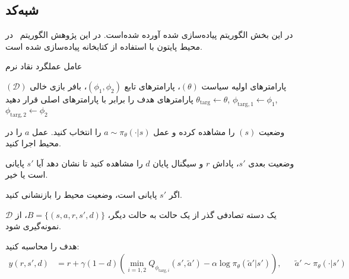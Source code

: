 \subsection{شبه‌کد
	}

در این بخش الگوریتم
پیاده‌سازی شده آورده شده‌است. در این پژوهش الگوریتم~ در محیط پایتون با استفاده از کتابخانه
 \cite{paszke2017automatic}
پیاده‌سازی شده ‌است.




  \begin{algorithm}[H]
	\caption{عامل عملگرد نقاد نرم}\label{alg:SAC}
	\begin{algorithmic}[1]
		 پارامترهای اولیه سیاست
		$(\theta)$، پارامترهای تابع
		$(\phi_1, \phi_2)$،
		بافر بازی خالی $(\mathcal{D})$
		\State پارامترهای هدف را برابر با پارامترهای اصلی قرار دهید
		$\theta_{\text{targ}} \leftarrow \theta$,
		$\phi_{\text{targ}, 1} \leftarrow \phi_1$,
		$\phi_{\text{targ}, 2} \leftarrow \phi_2$
		
		\State 
		وضعیت $(s)$ را مشاهده کرده و عمل 
		$a \sim \pi_{\theta}(\cdot|s)$
		را انتخاب کنید.
		\State عمل $a$ را در محیط اجرا کنید.
		  \State \parbox[t]{\dimexpr\linewidth-\algorithmicindent}{
					وضعیت بعدی $s'$، پاداش $r$ و سیگنال پایان $d$ را مشاهده کنید تا نشان دهد آیا $s'$ پایانی است یا خیر.
			\strut}

		\State اگر $s'$ پایانی است، وضعیت محیط را بازنشانی کنید.
			
		\State یک دسته تصادفی گذر از ‌یک حالت به حالت دیگر، $B = \{ (s,a,r,s',d) \}$، از $\mathcal{D}$ نمونه‌گیری شود.
		
		\State
		هدف را محاسبه کنید:
		\begin{align*}
			y (r,s',d) &= r + \gamma (1-d) \left(\min_{i=1,2} Q_{\phi_{\text{targ}, i}} (s', \tilde{a}') - \alpha \log \pi_{\theta}(\tilde{a}'|s')\right), && \tilde{a}' \sim \pi_{\theta}(\cdot|s')
		\end{align*}
		

\end{algorithmic}
\end{algorithm}
